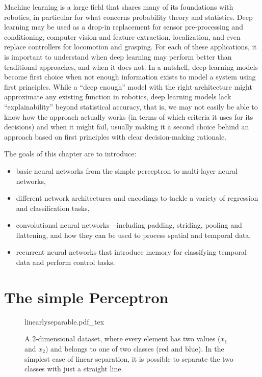 Machine learning is a large field that shares many of its foundations with robotics, in particular for what concerns probability theory and statistics. Deep learning may be used as a drop-in replacement for sensor pre-processing and conditioning, computer vision and feature extraction, localization, and even replace controllers for locomotion and grasping.
For each of these applications, it is important to understand when deep learning may perform better than traditional approaches, and when it does not.
In a nutshell, deep learning models become first choice when not enough information exists to model a system using first principles. While a ``deep enough'' model with the right architecture might approximate any existing function in robotics, deep learning models lack ``explainability'' beyond statistical accuracy, that is, we may not easily be able to know how the approach actually works (in terms of which criteria it uses for its decisions) and when it might fail, usually making it a second choice behind an approach based on first principles with clear decision-making rationale.

The goals of this chapter are to introduce:

\begin{itemize}
    \item basic neural networks from the simple perceptron to multi-layer neural networks,
    \item different network architectures and encodings to tackle a variety of regression and classification tasks,
    \item convolutional neural networks---including padding, striding, pooling and flattening, and how they can be used to process spatial and temporal data,
    \item recurrent neural networks that introduce memory for classifying temporal data and perform control tasks.
\end{itemize}


\section{The simple Perceptron}

\begin{figure}[!b]
    \centering
    \def\svgwidth{0.6\textwidth}
    {linearlyseparable.pdf_tex}
    \caption{A 2-dimensional dataset, where every element has two values ($x_1$ and $x_2$) and belongs to one of two classes (red and blue). In the simplest case of linear separation, it is possible to separate the two classes with just a straight line.\label{fig:linearsep}}
\end{figure}

